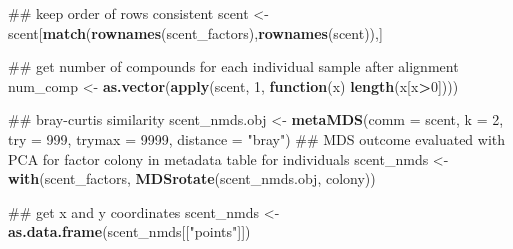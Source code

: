 \documentclass[]{article}
\newenvironment{Shaded}{\begin{snugshade}}{\end{snugshade}}
\newcommand{\KeywordTok}[1]{\textcolor[rgb]{0.13,0.29,0.53}{\textbf{#1}}}
\newcommand{\DataTypeTok}[1]{\textcolor[rgb]{0.13,0.29,0.53}{#1}}
\newcommand{\DecValTok}[1]{\textcolor[rgb]{0.00,0.00,0.81}{#1}}
\newcommand{\StringTok}[1]{\textcolor[rgb]{0.31,0.60,0.02}{#1}}
\newcommand{\ControlFlowTok}[1]{\textcolor[rgb]{0.13,0.29,0.53}{\textbf{#1}}}
\newcommand{\OperatorTok}[1]{\textcolor[rgb]{0.81,0.36,0.00}{\textbf{#1}}}
\newcommand{\NormalTok}[1]{#1}
\begin{document}
\begin{Shaded}
\begin{Highlighting}[]
{{\NormalTok{## keep order of rows consistent}
\NormalTok{scent <-}\StringTok{ }\NormalTok{scent[}\KeywordTok{match}\NormalTok{(}\KeywordTok{rownames}\NormalTok{(scent_factors),}\KeywordTok{rownames}\NormalTok{(scent)),] }

\NormalTok{## get number of compounds for each individual sample after alignment}
\NormalTok{num_comp <-}\StringTok{ }\KeywordTok{as.vector}\NormalTok{(}\KeywordTok{apply}\NormalTok{(scent, }\DecValTok{1}\NormalTok{, }\ControlFlowTok{function}\NormalTok{(x) }\KeywordTok{length}\NormalTok{(x[x}\OperatorTok{>}\DecValTok{0}\NormalTok{])))}

\NormalTok{## bray-curtis similarity}
\NormalTok{scent_nmds.obj <-}\StringTok{ }\KeywordTok{metaMDS}\NormalTok{(}\DataTypeTok{comm =}\NormalTok{ scent, }\DataTypeTok{k =} \DecValTok{2}\NormalTok{, }\DataTypeTok{try =} \DecValTok{999}\NormalTok{, }
                          \DataTypeTok{trymax =} \DecValTok{9999}\NormalTok{, }\DataTypeTok{distance =} \StringTok{"bray"}\NormalTok{) }
\NormalTok{## MDS outcome evaluated with PCA for factor colony in metadata table for individuals}
\NormalTok{scent_nmds <-}\StringTok{ }\KeywordTok{with}\NormalTok{(scent_factors, }\KeywordTok{MDSrotate}\NormalTok{(scent_nmds.obj, colony))}

\NormalTok{## get x and y coordinates}
\NormalTok{scent_nmds <-}\StringTok{ }\KeywordTok{as.data.frame}\NormalTok{(scent_nmds[[}\StringTok{"points"}\NormalTok{]])  }

}}
\end{Highlighting}
\end{Shaded}
\end{document}
